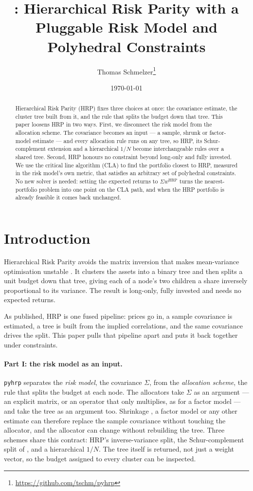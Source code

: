 \documentclass[11pt,a4paper]{article}
\title{\code{pyhrp}: Hierarchical Risk Parity with a Pluggable Risk Model
and Polyhedral Constraints}
\author{Thomas Schmelzer\thanks{\url{https://github.com/tschm/pyhrp}}}
\date{\today}
\newcommand{\code}[1]{\texttt{#1}}
\newcounter{algo}
\begin{document}
\maketitle

\begin{abstract}
Hierarchical Risk Parity (HRP) fixes three choices at once: the covariance
estimate, the cluster tree built from it, and the rule that splits the budget
down that tree. This paper loosens HRP in two ways. First, we disconnect the
risk model from the allocation scheme. The covariance becomes an input --- a
sample, shrunk or factor-model estimate --- and every allocation rule runs on
any tree, so HRP, its Schur-complement extension and a hierarchical $1/N$ become
interchangeable rules over a shared tree. Second, HRP honours no constraint
beyond long-only and fully invested. We use the critical line algorithm (CLA) to
find the portfolio closest to HRP, measured in the risk model's own metric, that
satisfies an arbitrary set of polyhedral constraints. No new solver is needed:
setting the expected returns to $\Sigma w^{\mathrm{HRP}}$ turns the
nearest-portfolio problem into one point on the CLA path, and when the HRP
portfolio is already feasible it comes back unchanged.
\end{abstract}

\section{Introduction}

Hierarchical Risk Parity \citep{lopezdeprado2016} avoids the matrix inversion
that makes mean-variance optimisation \citep{markowitz1952} unstable
\citep{michaud1989}. It clusters the assets into a binary tree and then splits a
unit budget down that tree, giving each of a node's two children a share
inversely proportional to its variance. The result is long-only, fully invested
and needs no expected returns.

As published, HRP is one fused pipeline: prices go in, a sample covariance is
estimated, a tree is built from the implied correlations, and the same
covariance drives the split. This paper pulls that pipeline apart and puts it
back together under constraints.

\paragraph{Part I: the risk model as an input.}
\code{pyhrp} separates the \emph{risk model}, the covariance $\Sigma$, from the
\emph{allocation scheme}, the rule that splits the budget at each node. The
allocators take $\Sigma$ as an argument --- an explicit matrix, or an operator
that only multiplies, as for a factor model --- and take the tree as an argument
too. Shrinkage \citep{ledoit2004}, a factor model or any other estimate can
therefore replace the sample covariance without touching the allocator, and the
allocator can change without rebuilding the tree. Three schemes share this
contract: HRP's inverse-variance split, the Schur-complement split of
\citet{cotton2024}, and a hierarchical $1/N$. The tree itself is returned, not
just a weight vector, so the budget assigned to every cluster can be inspected.
\end{document}
